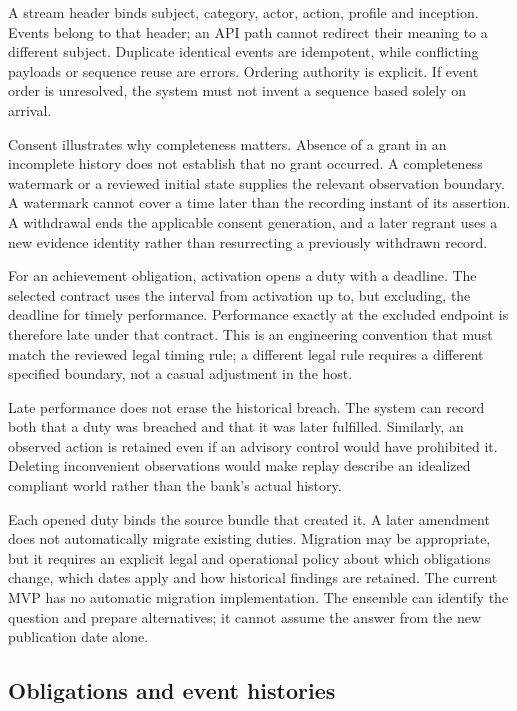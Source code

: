 A stream header binds subject, category, actor, action, profile and inception.
Events belong to that header; an API path cannot redirect their meaning to a
different subject. Duplicate identical events are idempotent, while conflicting
payloads or sequence reuse are errors. Ordering authority is explicit. If event
order is unresolved, the system must not invent a sequence based solely on arrival.

Consent illustrates why completeness matters. Absence of a grant in an incomplete
history does not establish that no grant occurred. A completeness watermark or a
reviewed initial state supplies the relevant observation boundary. A watermark
cannot cover a time later than the recording instant of its assertion. A
withdrawal ends the applicable consent generation, and a later regrant uses a new
evidence identity rather than resurrecting a previously withdrawn record.


For an achievement obligation, activation opens a duty with a deadline. The
selected contract uses the interval from activation up to, but excluding, the
deadline for timely performance. Performance exactly at the excluded endpoint is
therefore late under that contract. This is an engineering convention that must
match the reviewed legal timing rule; a different legal rule requires a different
specified boundary, not a casual adjustment in the host.

Late performance does not erase the historical breach. The system can record both
that a duty was breached and that it was later fulfilled. Similarly, an observed
action is retained even if an advisory control would have prohibited it. Deleting
inconvenient observations would make replay describe an idealized compliant world
rather than the bank's actual history.

Each opened duty binds the source bundle that created it. A later amendment does
not automatically migrate existing duties. Migration may be appropriate, but it
requires an explicit legal and operational policy about which obligations change,
which dates apply and how historical findings are retained. The current MVP has
no automatic migration implementation. The ensemble can identify the question
and prepare alternatives; it cannot assume the answer from the new publication
date alone.

\subsection{Obligations and event histories}
\label{merge:P-03-product:04}


